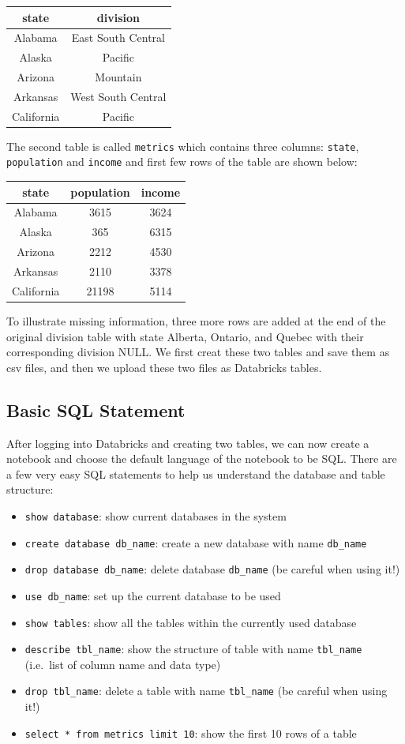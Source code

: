 \documentclass[12pt,]{krantz}
\providecommand{\tightlist}{%
  \setlength{\itemsep}{0pt}\setlength{\parskip}{0pt}}
\begin{document}
\begin{longtable}[]{@{}cc@{}}
\toprule
state & division\tabularnewline
\midrule
\endhead
Alabama & East South Central\tabularnewline
Alaska & Pacific\tabularnewline
Arizona & Mountain\tabularnewline
Arkansas & West South Central\tabularnewline
California & Pacific\tabularnewline
\bottomrule
\end{longtable}

The second table is called \texttt{metrics} which contains three columns: \texttt{state}, \texttt{population} and \texttt{income} and first few rows of the table are shown below:

\begin{longtable}[]{@{}ccc@{}}
\toprule
state & population & income\tabularnewline
\midrule
\endhead
Alabama & 3615 & 3624\tabularnewline
Alaska & 365 & 6315\tabularnewline
Arizona & 2212 & 4530\tabularnewline
Arkansas & 2110 & 3378\tabularnewline
California & 21198 & 5114\tabularnewline
\bottomrule
\end{longtable}

To illustrate missing information, three more rows are added at the end of the original division table with state Alberta, Ontario, and Quebec with their corresponding division NULL. We first creat these two tables and save them as csv files, and then we upload these two files as Databricks tables.

\hypertarget{basic-sql-statement}{%
\subsection{Basic SQL Statement}\label{basic-sql-statement}}

After logging into Databricks and creating two tables, we can now create a notebook and choose the default language of the notebook to be SQL. There are a few very easy SQL statements to help us understand the database and table structure:

\begin{itemize}
\tightlist
\item
  \texttt{show\ database}: show current databases in the system
\item
  \texttt{create\ database\ db\_name}: create a new database with name \texttt{db\_name}
\item
  \texttt{drop\ database\ db\_name}: delete database \texttt{db\_name} (be careful when using it!)
\item
  \texttt{use\ db\_name}: set up the current database to be used
\item
  \texttt{show\ tables}: show all the tables within the currently used database
\item
  \texttt{describe\ tbl\_name}: show the structure of table with name \texttt{tbl\_name} (i.e.~list of column name and data type)
\item
  \texttt{drop\ tbl\_name}: delete a table with name \texttt{tbl\_name} (be careful when using it!)
\item
  \texttt{select\ *\ from\ metrics\ limit\ 10}: show the first 10 rows of a table
\end{itemize}
\end{document}
